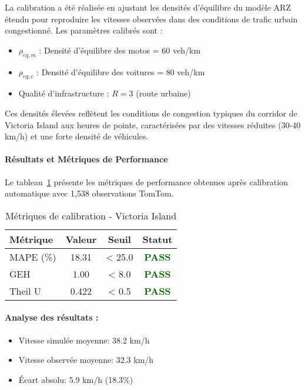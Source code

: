 La calibration a été réalisée en ajustant les densités d'équilibre du modèle ARZ étendu
pour reproduire les vitesses observées dans des conditions de trafic urbain congestionné.
Les paramètres calibrés sont :

\begin{itemize}
    \item $\rho_{eq,m}$ : Densité d'équilibre des motos = 60 veh/km
    \item $\rho_{eq,c}$ : Densité d'équilibre des voitures = 80 veh/km
    \item Qualité d'infrastructure : $R = 3$ (route urbaine)
\end{itemize}

Ces densités élevées reflètent les conditions de congestion typiques du corridor de Victoria Island
aux heures de pointe, caractérisées par des vitesses réduites (30-40 km/h) et une forte densité
de véhicules.

\paragraph{Résultats et Métriques de Performance}

Le tableau~\ref{tab:calibration_metrics_74} présente les métriques de performance
obtenues après calibration automatique avec 1,538 observations TomTom.

\begin{table}[h]
    \centering
    \caption{Métriques de calibration - Victoria Island}
    \label{tab:calibration_metrics_74}
    \begin{tabular}{|l|c|c|c|}
        \hline
        \textbf{Métrique} & \textbf{Valeur} & \textbf{Seuil} & \textbf{Statut}                  \\
        \hline
        MAPE (\%)         & 18.31           & < 25.0         & \textcolor{darkgreen}{\textbf{PASS}} \\
        GEH               & 1.00            & < 8.0          & \textcolor{darkgreen}{\textbf{PASS}} \\
        Theil U           & 0.422           & < 0.5          & \textcolor{darkgreen}{\textbf{PASS}} \\
        \hline
    \end{tabular}
\end{table}

\paragraph{Analyse des résultats :}
\begin{itemize}
    \item Vitesse simulée moyenne: 38.2 km/h
    \item Vitesse observée moyenne: 32.3 km/h
    \item Écart absolu: 5.9 km/h (18.3\%)
\end{itemize}

